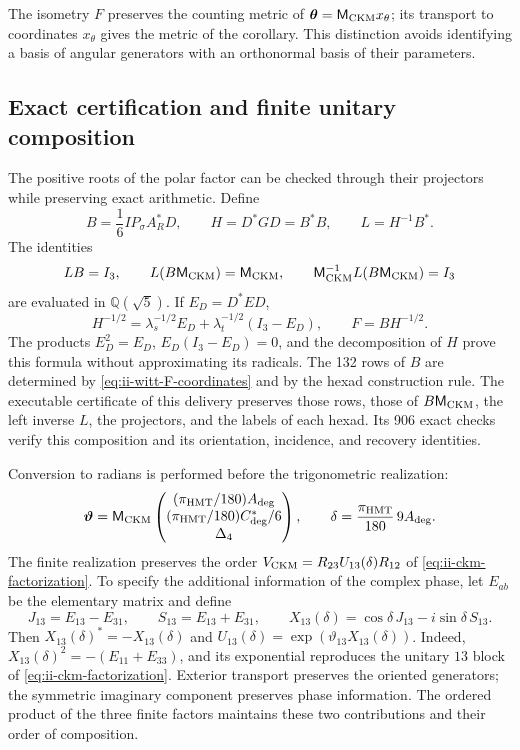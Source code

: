 The isometry \(F\) preserves the counting metric of
\(\boldsymbol\theta=\mathsf M_{\rm CKM}x_\theta\); its transport
to coordinates \(x_\theta\) gives the metric of the corollary. This
distinction avoids identifying a basis of angular generators with an
orthonormal basis of their parameters.

\subsection{Exact certification and finite unitary composition}

The positive roots of the polar factor can be checked through their
projectors while preserving exact arithmetic. Define
\begin{equation}
 B=\frac16IP_\sigma A_R^*D,\qquad
 H=D^*GD=B^*B,\qquad L=H^{-1}B^*.
 \label{eq:ii-witt-radical-free}
\end{equation}
The identities
\[
 LB=I_3,\qquad L(B\mathsf M_{\rm CKM})=\mathsf M_{\rm CKM},\qquad
 \mathsf M_{\rm CKM}^{-1}L(B\mathsf M_{\rm CKM})=I_3
\]
are evaluated in \(\mathbb Q(\sqrt5)\). If \(E_D=D^*ED\),
\[
 H^{-1/2}=\lambda_s^{-1/2}E_D+
          \lambda_t^{-1/2}(I_3-E_D),\qquad F=BH^{-1/2}.
\]
The products \(E_D^2=E_D\), \(E_D(I_3-E_D)=0\), and the
decomposition of \(H\) prove this formula without approximating its
radicals. The 132 rows of \(B\) are determined by
\eqref{eq:ii-witt-F-coordinates} and by the hexad construction
rule. The executable certificate of this delivery preserves those rows,
those of \(B\mathsf M_{\rm CKM}\), the left inverse \(L\),
the projectors, and the labels of each hexad. Its 906 exact
checks verify this composition and its orientation,
incidence, and recovery identities.

Conversion to radians is performed before the trigonometric realization:
\begin{equation}
 \boldsymbol\vartheta=
 \mathsf M_{\rm CKM}
 \begin{pmatrix}(\pi_{\rm HMT}/180)A_{\rm deg}\\
 (\pi_{\rm HMT}/180)C^*_{\rm deg}/6\\\Delta_4\end{pmatrix},
 \qquad
 \delta=\frac{\pi_{\rm HMT}}{180}\,9A_{\rm deg}.
 \label{eq:ii-witt-angular-units}
\end{equation}
The finite realization preserves the order
\(V_{\rm CKM}=R_{23}U_{13}(\delta)R_{12}\) of
\eqref{eq:ii-ckm-factorization}. To specify the additional information
of the complex phase, let \(E_{ab}\) be the elementary matrix and define
\[
 J_{13}=E_{13}-E_{31},\qquad S_{13}=E_{13}+E_{31},\qquad
 X_{13}(\delta)=\cos\delta\,J_{13}-i\sin\delta\,S_{13}.
\]
Then \(X_{13}(\delta)^*=-X_{13}(\delta)\) and
\(U_{13}(\delta)=\exp(\vartheta_{13}X_{13}(\delta))\).
Indeed, \(X_{13}(\delta)^2=-(E_{11}+E_{33})\), and its exponential
reproduces the unitary \(13\) block of
\eqref{eq:ii-ckm-factorization}. Exterior transport preserves the
oriented generators; the symmetric imaginary component preserves
phase information. The ordered product of the three finite
factors maintains these two contributions and their order of composition.

